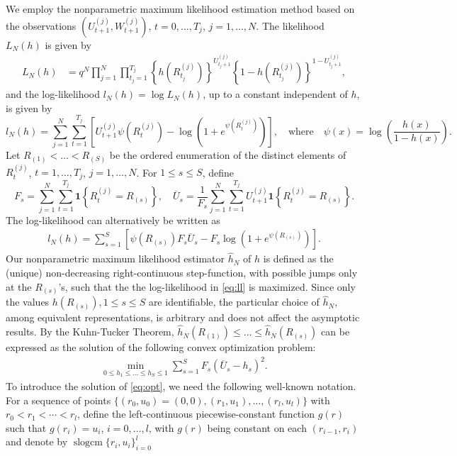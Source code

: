 \documentclass[12pt]{amsart}
\theoremstyle{plain}
\theoremstyle{remark}
\numberwithin{equation}{section}
\begin{document}
We employ the nonparametric maximum likelihood estimation method based on the observations $\left(U^{(j)}_{t+1}, W^{(j)}_{t+1}\right)$, $t=0, \ldots, {T_j}$, $j = 1, \ldots, N$. 
The likelihood 
$L_N(h)$ is given by
\begin{align*}
    L_N(h) &= 
    q^N\prod_{j=1}^N \prod_{t_j = 1}^{T_{j}}\left\{h\left(R^{(j)}_{t_j}\right)\right\}^{U^{(j)}_{t_j+1}}\left\{1-h\left(R^{(j)}_{t_j}\right)\right\}^{1-U^{(j)}_{t_j+1}},
\end{align*}
and the log-likelihood $l_N(h) = \log L_N(h)$, up to a constant independent of $h$, is given by
\[
   l_N(h) = \sum_{j=1}^N\sum_{t=1}^{T_j}\left[U^{(j)}_{t+1}\psi\left(R^{(j)}_{t}\right) - \log\left(1+e^{\psi\left(R^{(j)}_{t}\right)}\right)\right], \quad
\text{where} \quad \psi(x) = \log\left(\frac{h(x)}{1-h(x)}\right)
.\]
Let $R_{(1)} < \ldots < R_{(S)}$ be the ordered enumeration of the distinct elements of $R^{(j)}_{t}$, $t=1, \ldots, {T_j}$, $j = 1, \ldots, N$. For $1 \leq s \leq S$, define
\[
   {F}_s = \sum_{j=1}^N\sum_{t=1}^{T_j}\mathbf{1}\left\{R^{(j)}_{t} = R_{(s)}\right\}, 
   \quad \overline{U}_s = \frac{1}{{F}_s}\sum_{j=1}^N\sum_{t=1}^{T_j}U^{(j)}_{t+1}\mathbf{1}\left\{R^{(j)}_{t} = R_{(s)}\right\}.
\]
The log-likelihood can alternatively be written as
\begin{align}\label{eq:ll}
  l_N(h) = \sum_{s=1}^S \left[\psi\left(R_{(s)}\right){F}_s\overline{U}_s - {F}_s\log\left(1+e^{\psi\left(R_{(s)}\right)}\right)\right].
\end{align}
Our nonparametric maximum likelihood estimator $\hat{h}_N$ of $h$ is defined as the (unique) non-decreasing right-continuous step-function, with possible jumps only at the $R_{(s)}$'s, such that the
the log-likelihood in \eqref{eq:ll} is maximized. Since only the values \(h\left(R_{(s)}\right), 1 \leq s\leq S\) are identifiable, the particular choice of $\hat{h}_N$, among equivalent representations, is arbitrary and does not affect the asymptotic results. 
By  
the Kuhn-Tucker Theorem, 
\(\hat{h}_N\left(R_{(1)}\right) \leq \ldots \leq \hat{h}_N\left(R_{(s)}\right)\) can be expressed as the solution of the following convex optimization problem:  
\begin{align}\label{eq:opt}
\min_{0 \leq h_1 \leq \ldots \leq h_S \leq 1}\sum_{s=1}^S {F}_s(\overline{U}_s - h_s)^2.
\end{align}
To introduce the solution of \eqref{eq:opt}, we need the following well-known notation. For a sequence of points \(\{(r_0,u_0) = (0,0),(r_1,u_1),\ldots,(r_l, u_l)\}\) with \(r_0 < r_1 < \cdots < r_l\), define the left-continuous piecewise-constant function \(g(r)\) such that \(g(r_i) = u_i\), $i = 0, \ldots, l$, with \(g(r)\) being constant on each \((r_{i-1},r_i)\) and denote by $\operatorname{slogcm}\{r_i,u_i\}_{i=0}^l$ 
\end{document}
